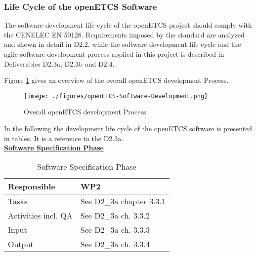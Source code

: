 \documentclass{template/openetcs_article}
\begin{document}
\subsubsection{Life Cycle of the openETCS Software}
The software development life-cycle of the openETCS project should comply with the CENELEC EN 50128. Requirements imposed by the standard are analyzed and shown in detail in D2.2, while the software development life cycle and the agile software development process applied in this project is described in Deliverables D2.3a, D2.3b and D2.4.

Figure \ref{fig:DevelopmentProcess} gives an overview of the overall openETCS development Process.\\

\begin{figure}[H]
\centering
\texttt{[image: ./figures/openETCS-Software-Development.png]}
\caption[Overall safety process]{Overall openETCS development Process}
\label{fig:DevelopmentProcess}
\end{figure}

In the following the development life cycle of the openETCS software is presented in tables. It is a reference to the D2.3a.\\

\underline{\textbf{Software Specification Phase}}

\begin{table}[H]
 \begin{center}
	\tablehead{\\}
	\begin{supertabular}[H]{|p{6cm}|p{8cm}|}
		\hline

		Responsible &
		WP2 \\
		\hline

		Tasks &
		See D2\_3a chapter 3.3.1\\
		\hline
	
		Activities incl. QA &
		See D2\_3a ch. 3.3.2\\
		\hline
	
		Input &
		See D2\_3a ch. 3.3.3\\
		\hline

		Output &
		See D2\_3a ch. 3.3.4\\ 
		\hline
		
		
	\end{supertabular}
\end{center}
	\caption{Software Specification Phase}
\end{table}
\end{document}
